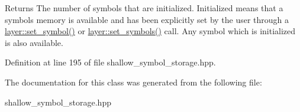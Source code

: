 \begin{DoxyReturn}{Returns}
The number of symbols that are initialized. Initialized means that a symbols memory is available and has been explicitly set by the user through a \hyperlink{group__storage__api_ga7f79fae19b4a2fd73d4c2c3c5be1ff7f}{layer\-::set\-\_\-symbol()} or \hyperlink{group__storage__api_gac90a4ce8eb50126267d92059c9e3b1a5}{layer\-::set\-\_\-symbols()} call. Any symbol which is initialized is also available. 
\end{DoxyReturn}


Definition at line 195 of file shallow\-\_\-symbol\-\_\-storage.\-hpp.



The documentation for this class was generated from the following file\-:\begin{DoxyCompactItemize}
\item 
shallow\-\_\-symbol\-\_\-storage.\-hpp\end{DoxyCompactItemize}
